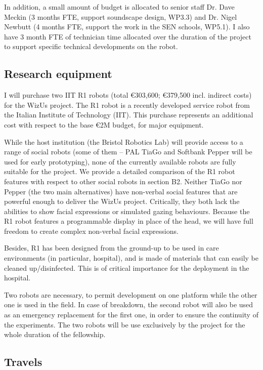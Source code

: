 In addition, a small amount of budget is allocated to senior staff Dr. Dave
Meckin (3 months FTE, support soundscape design, WP3.3) and Dr. Nigel Newbutt (4
months FTE, support the work in the SEN schools, WP5.1). I also have 3 month FTE
of technician time allocated over the duration of the project to support
specific technical developments on the robot.

\subsection{Research equipment}

I will purchase two IIT R1 robots (total €303,600; €379,500 incl. indirect
costs) for the WizUs project. The R1 robot is a recently developed service robot
from the Italian Institute of Technology (IIT). This purchase represents an
additional cost with respect to the base €2M budget, for major equipment.

While the host institution (the Bristol Robotics Lab) will provide access to a
range of social robots (some of them -- PAL TiaGo and Softbank Pepper will be
used for early prototyping), none of the currently available robots are fully
suitable for the project. We provide a detailed comparison of the R1 robot
features with respect to other social robots in section  B2. Neither TiaGo nor
Pepper (the two main alternatives) have non-verbal social features that are
powerful enough to deliver the WizUs project. Critically, they both lack the
abilities to show facial expressions or simulated gazing behaviours. Because the
R1 robot features a programmable display in place of the head, we will have full
freedom to create complex non-verbal facial expressions.

Besides, R1 has been designed from the ground-up to be used in care environments
(in particular, hospital), and is made of materials that can easily be cleaned
up/disinfected. This is of critical importance for the deployment in the
hospital.

Two robots are necessary, to permit development on one platform while the other
one is used in the field. In case of breakdown, the second robot will also be
used as an emergency replacement for the first one, in order to ensure the
continuity of the experiments. The two robots will be use exclusively by the
project for the whole duration of the fellowship.

\subsection{Travels}

